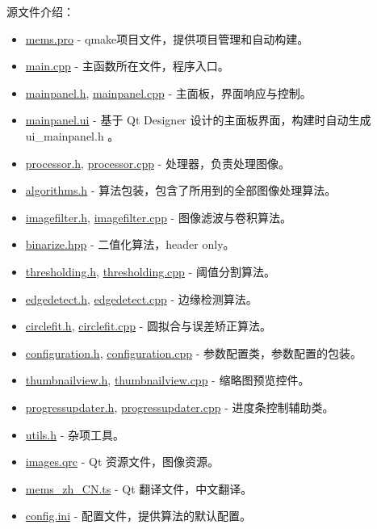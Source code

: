\documentclass[12pt,a4paper]{report}
\newcommand{\reporef}[1]{\href{https://github.com/miRoox/MEMS-oriented-image-testing-technology/blob/master/cpp-qt/#1}{#1}}
\begin{document}
源文件介绍：
\begin{itemize}
    \item \reporef{mems.pro} - qmake项目文件，提供项目管理和自动构建。
    \item \reporef{main.cpp} - 主函数所在文件，程序入口。
    \item \reporef{mainpanel.h}, \reporef{mainpanel.cpp} - 主面板，界面响应与控制。
    \item \reporef{mainpanel.ui} - 基于 Qt Designer 设计的主面板界面，构建时自动生成 ui\_mainpanel.h 。
    \item \reporef{processor.h}, \reporef{processor.cpp} - 处理器，负责处理图像。
    \item \reporef{algorithms.h} - 算法包装，包含了所用到的全部图像处理算法。
    \item \reporef{imagefilter.h}, \reporef{imagefilter.cpp} - 图像滤波与卷积算法。
    \item \reporef{binarize.hpp} - 二值化算法，header only。
    \item \reporef{thresholding.h}, \reporef{thresholding.cpp} - 阈值分割算法。
    \item \reporef{edgedetect.h}, \reporef{edgedetect.cpp} - 边缘检测算法。
    \item \reporef{circlefit.h}, \reporef{circlefit.cpp} - 圆拟合与误差矫正算法。
    \item \reporef{configuration.h}, \reporef{configuration.cpp} - 参数配置类，参数配置的包装。
    \item \reporef{thumbnailview.h}, \reporef{thumbnailview.cpp} - 缩略图预览控件。
    \item \reporef{progressupdater.h}, \reporef{progressupdater.cpp} - 进度条控制辅助类。
    \item \reporef{utils.h} - 杂项工具。
    \item \reporef{images.qrc} - Qt 资源文件，图像资源。
    \item \reporef{mems\_zh\_CN.ts} - Qt 翻译文件，中文翻译。
    \item \reporef{config.ini} - 配置文件，提供算法的默认配置。
\end{itemize}

\printbibliography[heading=bibliography,title=参考文献]
\end{document}
